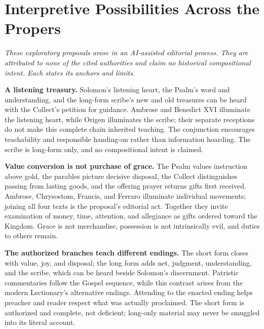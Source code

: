 \begin{deepstudy}
{{\begin{itemize}[itemsep=0.35em,topsep=0.2em,parsep=0pt]
\end{itemize}
}
}

\sectionguard
\section*{Interpretive Possibilities Across the Propers}

\noindent\emph{These exploratory proposals arose in an AI-assisted editorial process. They are attributed to none of the cited authorities and claim no historical compositional intent. Each states its anchors and limits.}

\begingroup
\footnotesize
{}
\noindent\textbf{A listening treasury.\enspace{}}
Solomon's listening heart, the Psalm's word and understanding, and the long-form scribe's new and old treasures can be heard with the Collect's petition for guidance. Ambrose and Benedict XVI illuminate the listening heart, while Origen illuminates the scribe; their separate receptions do not make this complete chain inherited teaching. The conjunction encourages teachability and responsible handing-on rather than information hoarding. The scribe is long-form only, and no compositional intent is claimed.

\noindent\textbf{Value conversion is not purchase of grace.\enspace{}}
The Psalm values instruction above gold, the parables picture decisive disposal, the Collect distinguishes passing from lasting goods, and the offering prayer returns gifts first received. Ambrose, Chrysostom, Francis, and Ferraro illuminate individual movements; joining all four texts is the proposal's editorial act. Together they invite examination of money, time, attention, and allegiance as gifts ordered toward the Kingdom. Grace is not merchandise, possession is not intrinsically evil, and duties to others remain.

\noindent\textbf{The authorized branches teach different endings.\enspace{}}
The short form closes with value, joy, and disposal; the long form adds net, judgment, understanding, and the scribe, which can be heard beside Solomon's discernment. Patristic commentaries follow the Gospel sequence, while this contrast arises from the modern Lectionary's alternative endings. Attending to the enacted ending helps preacher and reader respect what was actually proclaimed. The short form is authorized and complete, not deficient; long-only material may never be smuggled into its literal account.


\end{deepstudy}
